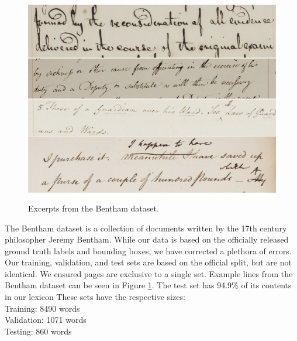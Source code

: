 \documentclass[ms,electronic,twosidetoc,letterpaper,chaptercenter,parttop,lof,lot]{byumsphd}
\begin{document}
\begin{figure}
    \centering
    \includegraphics[width=.9\textwidth]{bentham_examples}
    \caption{Excerpts from the Bentham dataset.}
    \label{fig:BenthamExamples}
\end{figure}

The Bentham dataset \cite{bentham} is a collection of documents written by the 17th century philosopher Jeremy Bentham. 
While our data is based on the officially released ground truth labels and bounding boxes, we have corrected a plethora of errors.
Our training, validation, and test sets are based on the official split, but are not identical.
We ensured pages are exclusive to a single set.
Example lines from the Bentham dataset can be seen in Figure \ref{fig:BenthamExamples}.
The test set has 94.9\% of its contents in our lexicon
These sets have the respective sizes:\\
\indent \indent Training: 8490 words\\
\indent \indent Validation: 1071 words\\
\indent \indent Testing: 860 words
\end{document}
